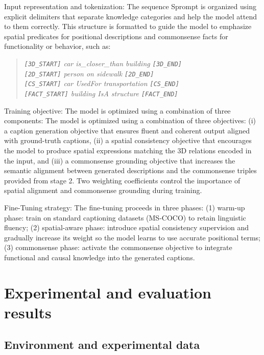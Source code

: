 \documentclass[runningheads,14pt]{llncs}
\begin{document}
Input representation and tokenization: The sequence Sprompt is organized using explicit delimiters that separate knowledge categories and help the model attend to them correctly. This structure is formatted to guide the model to emphasize spatial predicates for positional descriptions and commonsense facts for functionality or behavior, such as:

\begin{quote}
\textit{\texttt{[3D\_START]} car is\_closer\_than building \texttt{[3D\_END]}}\\
\textit{\texttt{[2D\_START]} person on sidewalk \texttt{[2D\_END]}}\\
\textit{\texttt{[CS\_START]} car UsedFor transportation \texttt{[CS\_END]}}\\
\textit{\texttt{[FACT\_START]} building IsA structure \texttt{[FACT\_END]}}
\end{quote}

Training objective: The model is optimized using a combination of three components: The model is optimized using a combination of three objectives: (i) a caption generation objective that ensures fluent and coherent output aligned with ground-truth captions, (ii) a spatial consistency objective that encourages the model to produce spatial expressions matching the 3D relations encoded in the input, and (iii) a commonsense grounding objective that increases the semantic alignment between generated descriptions and the commonsense triples provided from stage 2. Two weighting coefficients control the importance of spatial alignment and commonsense grounding during training.

Fine-Tuning strategy: The fine-tuning proceeds in three phases: (1) warm-up phase: train on standard captioning datasets (MS-COCO) to retain linguistic fluency; (2) spatial-aware phase: introduce spatial consistency supervision and gradually increase its weight so the model learns to use accurate positional terms; (3) commonsense phase: activate the commonsense objective to integrate functional and causal knowledge into the generated captions.


\section{Experimental and evaluation results}

\subsection{Environment and experimental data}
\end{document}
